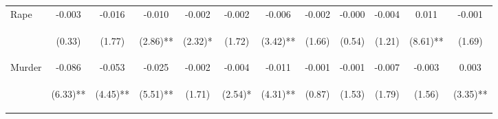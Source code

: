 \begin{tabular}{lccccccccccc}
\noalign{\smallskip}Rape & -0.003 & -0.016 & -0.010 & -0.002 & -0.002 & -0.006 & -0.002 & -0.000 & -0.004 & 0.011 & -0.001\\
 & \begin{footnotesize}(0.33)\end{footnotesize} & \begin{footnotesize}(1.77)\end{footnotesize} & \begin{footnotesize}(2.86)**\end{footnotesize} & \begin{footnotesize}(2.32)*\end{footnotesize} & \begin{footnotesize}(1.72)\end{footnotesize} & \begin{footnotesize}(3.42)**\end{footnotesize} & \begin{footnotesize}(1.66)\end{footnotesize} & \begin{footnotesize}(0.54)\end{footnotesize} & \begin{footnotesize}(1.21)\end{footnotesize} & \begin{footnotesize}(8.61)**\end{footnotesize} & \begin{footnotesize}(1.69)\end{footnotesize}\\
\noalign{\smallskip}Murder & -0.086 & -0.053 & -0.025 & -0.002 & -0.004 & -0.011 & -0.001 & -0.001 & -0.007 & -0.003 & 0.003\\
 & \begin{footnotesize}(6.33)**\end{footnotesize} & \begin{footnotesize}(4.45)**\end{footnotesize} & \begin{footnotesize}(5.51)**\end{footnotesize} & \begin{footnotesize}(1.71)\end{footnotesize} & \begin{footnotesize}(2.54)*\end{footnotesize} & \begin{footnotesize}(4.31)**\end{footnotesize} & \begin{footnotesize}(0.87)\end{footnotesize} & \begin{footnotesize}(1.53)\end{footnotesize} & \begin{footnotesize}(1.79)\end{footnotesize} & \begin{footnotesize}(1.56)\end{footnotesize} & \begin{footnotesize}(3.35)**\end{footnotesize}\\

\end{tabular}
